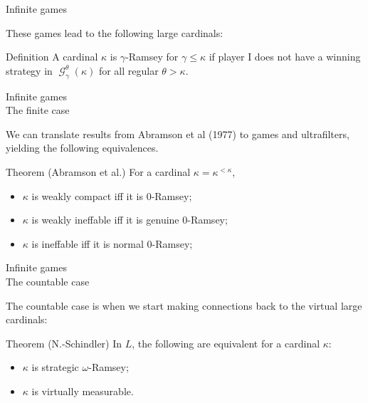 \documentclass{beamer}
\DeclareMathOperator{\G}{\mathcal G}
\begin{document}
\begin{frame}{Infinite games}

  These games lead to the following large cardinals:

  \begin{block}{Definition}
    A cardinal $\kappa$ is \alert<1>{$\gamma$-Ramsey} for $\gamma\leq\kappa$ if player I does not have a winning strategy in $\G_\gamma^\theta(\kappa)$ for all regular $\theta>\kappa$. 

  \end{block}
  
\end{frame}

\begin{frame}{Infinite games \\ {\small The finite case}}

  We can translate results from Abramson et al (1977) to games and ultrafilters, yielding the following equivalences.

  \begin{block}{Theorem (Abramson et al.)}
    For a cardinal $\kappa=\kappa^{<\kappa}$,
    \begin{itemize}
      \item $\kappa$ is \alert<1>{weakly compact} iff it is \alert<1>{$0$-Ramsey};
      \item $\kappa$ is \alert<1>{weakly ineffable} iff it is \alert<1>{genuine $0$-Ramsey};
      \item $\kappa$ is \alert<1>{ineffable} iff it is \alert<1>{normal $0$-Ramsey};
    \end{itemize}
  \end{block}


\end{frame}

\begin{frame}{Infinite games \\ {\small The countable case}}

  The countable case is when we start making connections back to the virtual large cardinals:

  \begin{block}{Theorem (N.-Schindler)}
    In $L$, the following are equivalent for a cardinal $\kappa$:
    \begin{itemize}
      \item $\kappa$ is strategic $\omega$-Ramsey;
      \item $\kappa$ is virtually measurable.
    \end{itemize}
  \end{block}

\end{frame}
\end{document}
